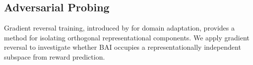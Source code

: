 \subsection{Adversarial Probing}

Gradient reversal training, introduced by \citet{Ganin2015} for domain adaptation, provides a method for isolating orthogonal representational components. We apply gradient reversal to investigate whether BAI occupies a representationally independent subspace from reward prediction.
